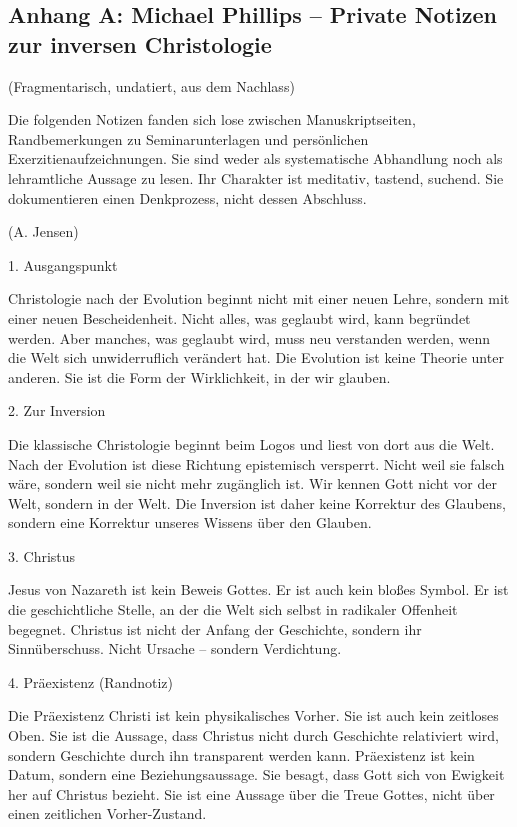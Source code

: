 \documentclass[
  ngerman,
]{article}
\begin{document}
\subsection{Anhang A: Michael Phillips -- Private Notizen zur inversen
Christologie}\label{anhang-a-michael-phillips-private-notizen-zur-inversen-christologie}

(Fragmentarisch, undatiert, aus dem Nachlass)

Die folgenden Notizen fanden sich lose zwischen Manuskriptseiten,
Randbemerkungen zu Seminarunterlagen und persönlichen
Exerzitienaufzeichnungen. Sie sind weder als systematische Abhandlung
noch als lehramtliche Aussage zu lesen. Ihr Charakter ist meditativ,
tastend, suchend. Sie dokumentieren einen Denkprozess, nicht dessen
Abschluss.

(A. Jensen)

1. Ausgangspunkt

Christologie nach der Evolution beginnt nicht mit einer neuen Lehre,
sondern mit einer neuen Bescheidenheit. Nicht alles, was geglaubt wird,
kann begründet werden. Aber manches, was geglaubt wird, muss neu
verstanden werden, wenn die Welt sich unwiderruflich verändert hat. Die
Evolution ist keine Theorie unter anderen. Sie ist die Form der
Wirklichkeit, in der wir glauben.

2. Zur Inversion

Die klassische Christologie beginnt beim Logos und liest von dort aus
die Welt. Nach der Evolution ist diese Richtung epistemisch versperrt.
Nicht weil sie falsch wäre, sondern weil sie nicht mehr zugänglich ist.
Wir kennen Gott nicht vor der Welt, sondern in der Welt. Die Inversion
ist daher keine Korrektur des Glaubens, sondern eine Korrektur unseres
Wissens über den Glauben.

3. Christus

Jesus von Nazareth ist kein Beweis Gottes. Er ist auch kein bloßes
Symbol. Er ist die geschichtliche Stelle, an der die Welt sich selbst in
radikaler Offenheit begegnet. Christus ist nicht der Anfang der
Geschichte, sondern ihr Sinnüberschuss. Nicht Ursache -- sondern
Verdichtung.

4. Präexistenz (Randnotiz)

Die Präexistenz Christi ist kein physikalisches Vorher. Sie ist auch
kein zeitloses Oben. Sie ist die Aussage, dass Christus nicht durch
Geschichte relativiert wird, sondern Geschichte durch ihn transparent
werden kann. Präexistenz ist kein Datum, sondern eine Beziehungsaussage.
Sie besagt, dass Gott sich von Ewigkeit her auf Christus bezieht. Sie
ist eine Aussage über die Treue Gottes, nicht über einen zeitlichen
Vorher-Zustand.
\end{document}
